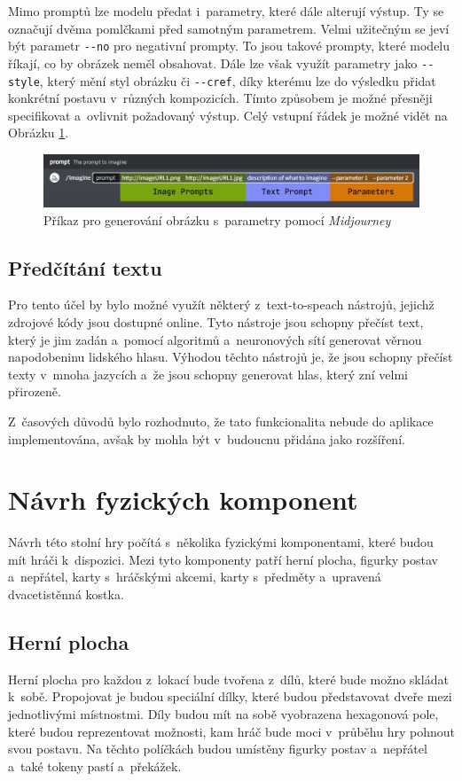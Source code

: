 Mimo promptů lze modelu předat i~parametry, které dále alterují výstup. Ty se označují dvěma pomlčkami před samotným parametrem. Velmi užitečným se jeví být parametr \texttt{{-}{-}no} pro negativní prompty. To jsou takové prompty, které modelu říkají, co by obrázek neměl obsahovat. Dále lze však využít parametry jako \texttt{{-}{-}style}, který mění styl obrázku či \texttt{{-}{-}cref}, díky kterému lze do výsledku přidat konkrétní postavu v~různých kompozicích. Tímto způsobem je možné přesněji specifikovat a~ovlivnit požadovaný výstup. Celý vstupní řádek je možné vidět na Obrázku \ref{fig:mj_prompts_params}.

\begin{figure}[H]
    \centering
    \includegraphics[width=1\textwidth]{resources/figures/midjourney_prompts_params.png}
    \caption{Příkaz pro generování obrázku s~parametry pomocí \textit{Midjourney} \cite{midjourney}}
    \label{fig:mj_prompts_params}
\end{figure}

\subsection{Předčítání textu}
Pro tento účel by bylo možné využít některý z~text-to-speach nástrojů, jejichž zdrojové kódy jsou dostupné online. Tyto nástroje jsou schopny přečíst text, který je jim zadán a~pomocí algoritmů a~neuronových sítí generovat věrnou napodobeninu lidského hlasu. Výhodou těchto nástrojů je, že jsou schopny přečíst texty v~mnoha jazycích a~že jsou schopny generovat hlas, který zní velmi přirozeně.

Z~časových důvodů bylo rozhodnuto, že tato funkcionalita nebude do aplikace implementována, avšak by mohla být v~budoucnu přidána jako rozšíření.

\section{Návrh fyzických komponent}
Návrh této stolní hry počítá s~několika fyzickými komponentami, které budou mít hráči k~dispozici. Mezi tyto komponenty patří herní plocha, figurky postav a~nepřátel, karty s~hráčskými akcemi, karty s~předměty a~upravená dvacetistěnná kostka.

\subsection{Herní plocha}
Herní plocha pro každou z~lokací bude tvořena z~dílů, které bude možno skládat k~sobě. Propojovat je budou speciální dílky, které budou představovat dveře mezi jednotlivými místnostmi. Díly budou mít na sobě vyobrazena hexagonová pole, které budou reprezentovat možnosti, kam hráč bude moci v~průběhu hry pohnout svou postavu. Na těchto políčkách budou umístěny figurky postav a~nepřátel a~také tokeny pastí a~překážek.

